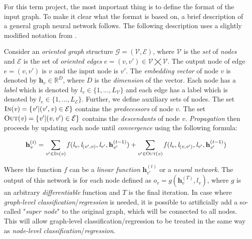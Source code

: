 For this term project, the most important thing is to define the format of the input graph. To make it clear what the format is based on, a brief description of a general graph neural network follows. The following description uses a slightly modified notation from \cite{GGNN-li2015gated}. 

Consider an \textit{oriented graph} structure $\mathcal{G} = (\mathcal{V}, \mathcal{E})$, where $\mathcal{V}$ is the \textit{set} of \textit{nodes} and $\mathcal{E}$ is the set of \textit{oriented edges} $\mathit{e} = ( \mathit{v}, \mathit{v}' ) \in \mathcal{V} \bigtimes \mathcal{V}$. The output node of edge $\mathit{e} = ( \mathit{v}, \mathit{v}' )$ is $\mathit{v}$ and the input node is $\mathit{v}'$. The \textit{embedding vector} of node $\mathit{v}$ is denoted by $\textbf{h}_\mathit{v} \in \mathbb{R}^\mathit{D}$, where $\mathit{D}$ is the \textit{dimension} of the vector. Each node has a \textit{label} which is denoted by $\mathit{l}_\mathit{v} \in \{1, ... , \mathit{L}_\mathcal{V}\}$ and each edge has a label which is denoted by $\mathit{l}_\mathit{e} \in \{1, ... , \mathit{L}_\mathcal{E}\}$. Further, we define auxiliary sets of nodes. The set $\textsc{In}(\mathit{v}) = \{\mathit{v}' | (\mathit{v}', \mathit{v}) \in \mathcal{E}\}$ contains the \textit{predecessors} of node $\mathit{v}$. The set $\textsc{Out}(\mathit{v}) = \{\mathit{v}' | (\mathit{v}, \mathit{v}') \in \mathcal{E}\}$ contains the \textit{descendants} of node $\mathit{v}$. \textit{Propagation} then proceeds by updating each node until \textit{convergence} using the following formula:

\begin{equation*}
	\textbf{h}_\mathit{v}^{(\mathit{t})} = \sum_{\mathit{v}' \in \textsc{In}(\mathit{v})} \mathit{f}(\mathit{l}_\mathit{v}, \mathit{l}_{(\mathit{v}', \mathit{v})}, \mathit{l}_{\mathit{v}'}, \textbf{h}_{\mathit{v}'}^{(\mathit{t}-1)}) + \sum_{\mathit{v}' \in \textsc{Out}(\mathit{v})} \mathit{f}(\mathit{l}_\mathit{v}, \mathit{l}_{(\mathit{v}, \mathit{v}')}, \mathit{l}_{\mathit{v}'}, \textbf{h}_{\mathit{v}'}^{(\mathit{t}-1)})
\end{equation*}

Where the function $\mathit{f}$ can be a \textit{linear function} $\textbf{h}_{\mathit{v}'}^{(\mathit{t})}$ or a \textit{neural network}. The output of this
network is for each node defined as $\mathit{o}_\mathit{v} = \mathit{g}(\textbf{h}_\mathit{v}^{(\mathit{T})}, \mathit{l}_\mathit{v})$, where $\mathit{g}$ is an arbitrary \textit{differentiable} function and $\mathit{T}$ is the final iteration. In case where \textit{graph-level classification}/\textit{regression} is needed, it is possible to artificially add a so-called "\textit{super node}" to the original graph, which will be connected to all nodes. This will allow graph-level classification/regression to be treated in the same way as \textit{node-level classification}/\textit{regression}.

